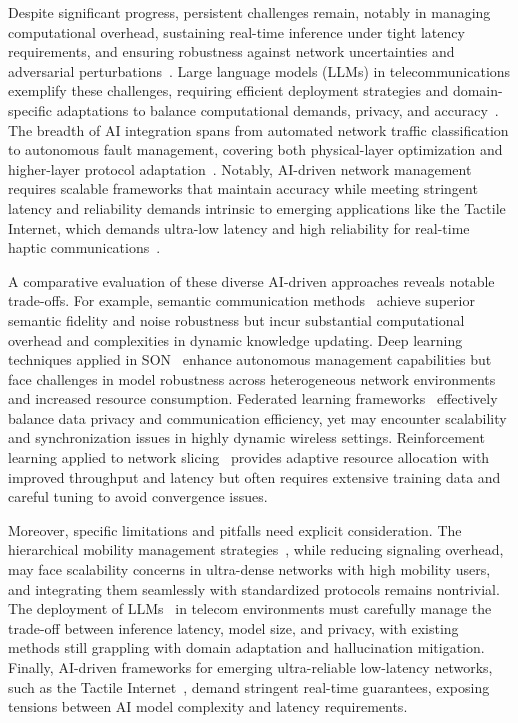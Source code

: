 \documentclass[sigconf]{acmart}
\begin{document}
Despite significant progress, persistent challenges remain, notably in managing computational overhead, sustaining real-time inference under tight latency requirements, and ensuring robustness against network uncertainties and adversarial perturbations~\cite{ref7,ref8,ref9}. Large language models (LLMs) in telecommunications exemplify these challenges, requiring efficient deployment strategies and domain-specific adaptations to balance computational demands, privacy, and accuracy~\cite{ref7}. The breadth of AI integration spans from automated network traffic classification to autonomous fault management, covering both physical-layer optimization and higher-layer protocol adaptation~\cite{ref10,ref49,ref50}. Notably, AI-driven network management requires scalable frameworks that maintain accuracy while meeting stringent latency and reliability demands intrinsic to emerging applications like the Tactile Internet, which demands ultra-low latency and high reliability for real-time haptic communications~\cite{ref10}. 

A comparative evaluation of these diverse AI-driven approaches reveals notable trade-offs. For example, semantic communication methods~\cite{ref1} achieve superior semantic fidelity and noise robustness but incur substantial computational overhead and complexities in dynamic knowledge updating. Deep learning techniques applied in SON~\cite{ref2} enhance autonomous management capabilities but face challenges in model robustness across heterogeneous network environments and increased resource consumption. Federated learning frameworks~\cite{ref4,ref5} effectively balance data privacy and communication efficiency, yet may encounter scalability and synchronization issues in highly dynamic wireless settings. Reinforcement learning applied to network slicing~\cite{ref6} provides adaptive resource allocation with improved throughput and latency but often requires extensive training data and careful tuning to avoid convergence issues.

Moreover, specific limitations and pitfalls need explicit consideration. The hierarchical mobility management strategies~\cite{ref19}, while reducing signaling overhead, may face scalability concerns in ultra-dense networks with high mobility users, and integrating them seamlessly with standardized protocols remains nontrivial. The deployment of LLMs~\cite{ref7} in telecom environments must carefully manage the trade-off between inference latency, model size, and privacy, with existing methods still grappling with domain adaptation and hallucination mitigation. Finally, AI-driven frameworks for emerging ultra-reliable low-latency networks, such as the Tactile Internet~\cite{ref10}, demand stringent real-time guarantees, exposing tensions between AI model complexity and latency requirements.
\end{document}
